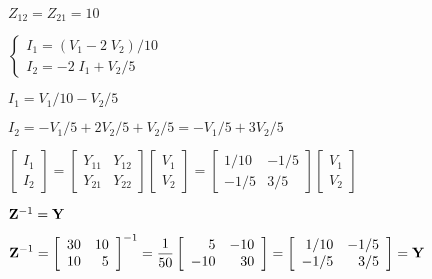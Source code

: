 \documentclass{article}
\def\lthtmlcheckvsize{\ifdim\ht\sizebox<\vsize 
  \ifdim\wd\sizebox<\hsize\expandafter\hfill\fi \expandafter\vfill
  \else\expandafter\vss\fi}%
\begin{document}
{\newpage\clearpage
{}%
$ Z_{12}=Z_{21}=10$%
\lthtmlindisplaymathZ
\lthtmlcheckvsize\clearpage}

{\newpage\clearpage
{}%
$\displaystyle \left\{ \begin{array}{l}
I_1=(V_1-2\;V_2)/10 \\I_2=-2\;I_1+V_2/5 \end{array} \right.$%
\lthtmlindisplaymathZ
\lthtmlcheckvsize\clearpage}

{\newpage\clearpage
{}%
$\displaystyle I_1=V_1/10-V_2/5$%
\lthtmlindisplaymathZ
\lthtmlcheckvsize\clearpage}

{\newpage\clearpage
{}%
$\displaystyle I_2=-V_1/5+2V_2/5+V_2/5=-V_1/5+3V_2/5$%
\lthtmlindisplaymathZ
\lthtmlcheckvsize\clearpage}

{\newpage\clearpage
{}%
$\displaystyle \left[ \begin{array}{l} I_1 \\I_2 \end{array} \right]=
\left[ \begin{array}{rr} Y_{11} & Y_{12} \\Y_{21} & Y_{22} \end{array} \right]
\left[ \begin{array}{l} V_1 \\V_2 \end{array} \right]
=\left[ \begin{array}{rr} 1/10 & -1/5 \\-1/5 & 3/5 \end{array} \right]
\left[ \begin{array}{l} V_1 \\V_2 \end{array} \right]$%
\lthtmlindisplaymathZ
\lthtmlcheckvsize\clearpage}

{\newpage\clearpage
{}%
$ {\bf Z}^{-1}={\bf Y}$%
\lthtmlindisplaymathZ
\lthtmlcheckvsize\clearpage}

{\newpage\clearpage
{}%
$\displaystyle {\bf Z}^{-1}=\left[ \begin{array}{rr} 30 & 10 \\10 & 5 \end{array} \right]^{-1}
=\frac{1}{50}\left[ \begin{array}{rr} 5 & -10 \\-10 & 30 \end{array} \right]
=\left[ \begin{array}{rr} 1/10 & -1/5 \\-1/5 & 3/5 \end{array} \right]
={\bf Y}$%
\lthtmlindisplaymathZ
\lthtmlcheckvsize\clearpage}
\end{document}
